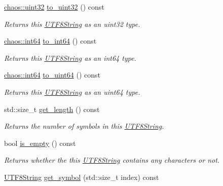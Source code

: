 \begin{DoxyCompactItemize}
\hyperlink{namespacechaos_a8641b3ae4551f0b35570d4f9f4ec22d9}{chaos\-::uint32} \hyperlink{classchaos_1_1uni_1_1_u_t_f8_string_aa752c6db6c5a4f62c0c158d0bf7c0742}{to\-\_\-uint32} () const 
\begin{DoxyCompactList}\small\item\em Returns this \hyperlink{classchaos_1_1uni_1_1_u_t_f8_string}{U\-T\-F8\-String} as an uint32 type. \end{DoxyCompactList}\item 
\hyperlink{namespacechaos_aa4cfe70894188e01134a2694db2eb2db}{chaos\-::int64} \hyperlink{classchaos_1_1uni_1_1_u_t_f8_string_ac9db9e86ffa8572ba7ecf576d764d89f}{to\-\_\-int64} () const 
\begin{DoxyCompactList}\small\item\em Returns this \hyperlink{classchaos_1_1uni_1_1_u_t_f8_string}{U\-T\-F8\-String} as an int64 type. \end{DoxyCompactList}\item 
\hyperlink{namespacechaos_aa4cfe70894188e01134a2694db2eb2db}{chaos\-::int64} \hyperlink{classchaos_1_1uni_1_1_u_t_f8_string_afe8cb74c9fef1767790a33af2179a0b4}{to\-\_\-uint64} () const 
\begin{DoxyCompactList}\small\item\em Returns this \hyperlink{classchaos_1_1uni_1_1_u_t_f8_string}{U\-T\-F8\-String} as an uint64 type. \end{DoxyCompactList}\item 
std\-::size\-\_\-t \hyperlink{classchaos_1_1uni_1_1_u_t_f8_string_a9e0ec9cb771652c5ad61e2b54cf8b2aa}{get\-\_\-length} () const 
\begin{DoxyCompactList}\small\item\em Returns the number of symbols in this \hyperlink{classchaos_1_1uni_1_1_u_t_f8_string}{U\-T\-F8\-String}. \end{DoxyCompactList}\item 
bool \hyperlink{classchaos_1_1uni_1_1_u_t_f8_string_ad99ed42fcbd51651e6d626bab469af59}{is\-\_\-empty} () const 
\begin{DoxyCompactList}\small\item\em Returns whether the this \hyperlink{classchaos_1_1uni_1_1_u_t_f8_string}{U\-T\-F8\-String} contains any characters or not. \end{DoxyCompactList}\item 
\hyperlink{classchaos_1_1uni_1_1_u_t_f8_string}{U\-T\-F8\-String} \hyperlink{classchaos_1_1uni_1_1_u_t_f8_string_ae286e5ec21f22f709777dd7ecd55e05e}{get\-\_\-symbol} (std\-::size\-\_\-t index) const 

\end{DoxyCompactItemize}
